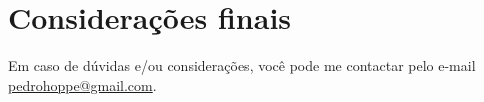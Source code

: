 \documentclass[
article,			%
11pt,				%
oneside,			%
a4paper,			%
english,			%
brazil,				%
sumario=tradicional
]{abntex2}
\begin{document}



	\section{Considerações finais}
Em caso de dúvidas e/ou considerações, você pode me contactar pelo e-mail \url{pedrohoppe@gmail.com}.
	\postextual
	
	
	
	
	

	

	
\end{document}
